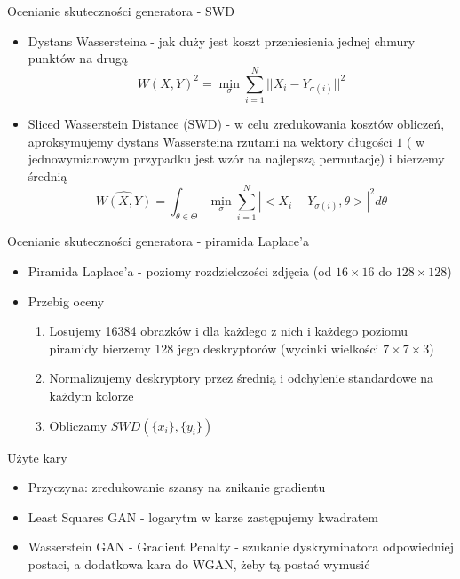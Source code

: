 \documentclass[11pt]{beamer}
\begin{document}
\begin{frame}{Ocenianie skuteczności generatora - SWD}
\begin{itemize}
    \item Dystans Wassersteina - jak duży jest koszt przeniesienia jednej chmury punktów na drugą
    $$ W(X,Y)^2 = \min_{\sigma} \sum_{i=1}^N ||X_i - Y_{\sigma(i)} ||^2$$
    \item Sliced Wasserstein Distance (SWD)  - w celu zredukowania kosztów obliczeń, aproksymujemy dystans Wassersteina rzutami na wektory długości $1$ ( w jednowymiarowym przypadku jest wzór na najlepszą permutację) i bierzemy średnią 
    $$ \hat{W(X,Y)} = \int_{\theta \in \Theta} \min_{\sigma} \sum_{i=1}^N  |<X_i-Y_{\sigma(i)}, \theta>|^2 d\theta$$
\end{itemize}
\end{frame}

\begin{frame}{Ocenianie skuteczności generatora - piramida Laplace'a}
\begin{itemize}
    \item Piramida Laplace'a - poziomy rozdzielczości zdjęcia (od $16\times16$ do $128\times128$)
    \item Przebig oceny 
    \begin{enumerate}
        \item Losujemy 16384 obrazków i dla każdego z nich i każdego poziomu piramidy bierzemy 128 jego deskryptorów (wycinki wielkości $7\times7\times3$)
        \item Normalizujemy deskryptory przez średnią i odchylenie standardowe na każdym kolorze
        \item Obliczamy $SWD(\{x_i\},\{y_i\})$
    \end{enumerate}
\end{itemize}
\end{frame}

\begin{frame}{Użyte kary}
\begin{itemize}
    \item Przyczyna: zredukowanie szansy na znikanie gradientu
    \item Least Squares GAN - logarytm w karze zastępujemy kwadratem
    \item Wasserstein GAN - Gradient Penalty - szukanie dyskryminatora odpowiedniej postaci, a dodatkowa kara do WGAN, żeby tą postać wymusić
\end{itemize}
\end{frame}
\end{document}
